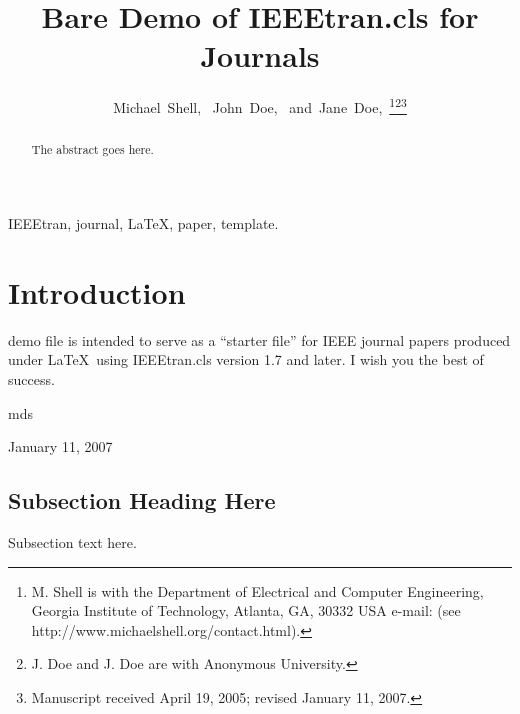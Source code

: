 \documentclass[journal]{IEEEtran}
\begin{document}
\title{Bare Demo of IEEEtran.cls for Journals}


\author{Michael~Shell,~
        John~Doe,~
        and~Jane~Doe,~\thanks{M. Shell is with the Department
of Electrical and Computer Engineering, Georgia Institute of Technology, Atlanta,
GA, 30332 USA e-mail: (see http://www.michaelshell.org/contact.html).}\thanks{J. Doe and J. Doe are with Anonymous University.}\thanks{Manuscript received April 19, 2005; revised January 11, 2007.}}



















\maketitle


\begin{abstract}
The abstract goes here.
\end{abstract}


\begin{IEEEkeywords}
IEEEtran, journal, \LaTeX, paper, template.
\end{IEEEkeywords}






\IEEEpeerreviewmaketitle



\section{Introduction}
 demo file is intended to serve as a ``starter file''
for IEEE journal papers produced under \LaTeX\ using
IEEEtran.cls version 1.7 and later.
I wish you the best of success.

\hfill mds
 
\hfill January 11, 2007

\subsection{Subsection Heading Here}
Subsection text here.
\end{document}
